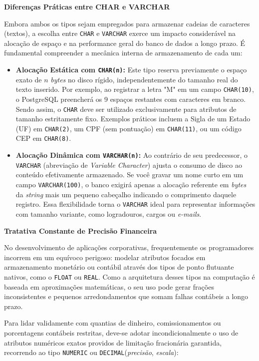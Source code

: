 \noindent\textbf{Diferenças Práticas entre CHAR e VARCHAR}

Embora ambos os tipos sejam empregados para armazenar cadeias de caracteres (textos), a escolha entre \texttt{CHAR} e \texttt{VARCHAR} exerce um impacto considerável na alocação de espaço e na performance geral do banco de dados a longo prazo. É fundamental compreender a mecânica interna de armazenamento de cada um:

\begin{itemize}
    \item \textbf{Alocação Estática com \texttt{CHAR(n)}:} Este tipo reserva previamente o espaço exato de $n$ \textit{bytes} no disco rígido, independentemente do tamanho real do texto inserido. Por exemplo, ao registrar a letra "M" em um campo \texttt{CHAR(10)}, o PostgreSQL preencherá os 9 espaços restantes com caracteres em branco. Sendo assim, o \texttt{CHAR} deve ser utilizado exclusivamente para atributos de tamanho estritamente fixo. Exemplos práticos incluem a Sigla de um Estado (UF) em \texttt{CHAR(2)}, um CPF (sem pontuação) em \texttt{CHAR(11)}, ou um código CEP em \texttt{CHAR(8)}.
    
    \item \textbf{Alocação Dinâmica com \texttt{VARCHAR(n)}:} Ao contrário de seu predecessor, o \texttt{VARCHAR} (abreviação de \textit{Variable Character}) ajusta o consumo de disco ao conteúdo efetivamente armazenado. Se você gravar um nome curto em um campo \texttt{VARCHAR(100)}, o banco exigirá apenas a alocação referente em \textit{bytes} da \textit{string} mais um pequeno cabeçalho indicando o comprimento daquele registro. Essa flexibilidade torna o \texttt{VARCHAR} ideal para representar informações com tamanho variante, como logradouros, cargos ou \textit{e-mails}.
\end{itemize}

\vspace{0.3cm}
\noindent\textbf{Tratativa Constante de Precisão Financeira}

No desenvolvimento de aplicações corporativas, frequentemente os programadores incorrem em um equívoco perigoso: modelar atributos focados em armazenamento monetário ou contábil através dos tipos de ponto flutuante nativos, como o \texttt{FLOAT} ou \texttt{REAL}. Como a arquitetura desses tipos na computação é baseada em aproximações matemáticas, o seu uso pode gerar frações inconsistentes e pequenos arredondamentos que somam falhas contábeis a longo prazo.

Para lidar validamente com quantias de dinheiro, comissionamentos ou porcentagens contábeis restritas, deve-se adotar incondicionalmente o uso de atributos numéricos exatos providos de limitação fracionária garantida, recorrendo ao tipo \texttt{NUMERIC} ou \texttt{DECIMAL}(\textit{precisão}, \textit{escala}):

